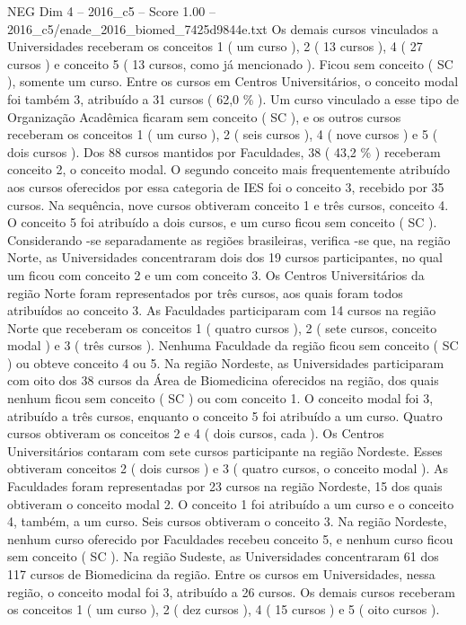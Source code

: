 \begin{textsample}{NEG Dim 4 – 2016\_c5 – Score 1.00 – 2016\_c5/enade\_2016\_biomed\_7425d9844e.txt}
Os demais cursos vinculados a Universidades receberam os conceitos 1 ( um curso ), 2 ( 13 cursos ), 4 ( 27 cursos ) e conceito 5 ( 13 cursos, como já mencionado ).
Ficou sem conceito ( SC ), somente um curso.
Entre os cursos em Centros Universitários, o conceito modal foi também 3, atribuído a 31 cursos ( 62,0 \% ).
Um curso vinculado a esse tipo de Organização Acadêmica ficaram sem conceito ( SC ), e os outros cursos receberam os conceitos 1 ( um curso ), 2 ( seis cursos ), 4 ( nove cursos ) e 5 ( dois cursos ).
Dos 88 cursos mantidos por Faculdades, 38 ( 43,2 \% ) receberam conceito 2, o conceito modal.
O segundo conceito mais frequentemente atribuído aos cursos oferecidos por essa categoria de IES foi o conceito 3, recebido por 35 cursos.
Na sequência, nove cursos obtiveram conceito 1 e três cursos, conceito 4.
O conceito 5 foi atribuído a dois cursos, e um curso ficou sem conceito ( SC ).
Considerando -se separadamente as regiões brasileiras, verifica -se que, na região Norte, as Universidades concentraram dois dos 19 cursos participantes, no qual um ficou com conceito 2 e um com conceito 3.
Os Centros Universitários da região Norte foram representados por três cursos, aos quais foram todos atribuídos ao conceito 3.
As Faculdades participaram com 14 cursos na região Norte que receberam os conceitos 1 ( quatro cursos ), 2 ( sete cursos, conceito modal ) e 3 ( três cursos ).
Nenhuma Faculdade da região ficou sem conceito ( SC ) ou obteve conceito 4 ou 5.
Na região Nordeste, as Universidades participaram com oito dos 38 cursos da Área de Biomedicina oferecidos na região, dos quais nenhum ficou sem conceito ( SC ) ou com conceito 1.
O conceito modal foi 3, atribuído a três cursos, enquanto o conceito 5 foi atribuído a um curso.
Quatro cursos obtiveram os conceitos 2 e 4 ( dois cursos, cada ).
Os Centros Universitários contaram com sete cursos participante na região Nordeste.
Esses obtiveram conceitos 2 ( dois cursos ) e 3 ( quatro cursos, o conceito modal ).
As Faculdades foram representadas por 23 cursos na região Nordeste, 15 dos quais obtiveram o conceito modal 2.
O conceito 1 foi atribuído a um curso e o conceito 4, também, a um curso.
Seis cursos obtiveram o conceito 3.
Na região Nordeste, nenhum curso oferecido por Faculdades recebeu conceito 5, e nenhum curso ficou sem conceito ( SC ).
Na região Sudeste, as Universidades concentraram 61 dos 117 cursos de Biomedicina da região.
Entre os cursos em Universidades, nessa região, o conceito modal foi 3, atribuído a 26 cursos.
Os demais cursos receberam os conceitos 1 ( um curso ), 2 ( dez cursos ), 4 ( 15 cursos ) e 5 ( oito cursos ).

\end{textsample}
